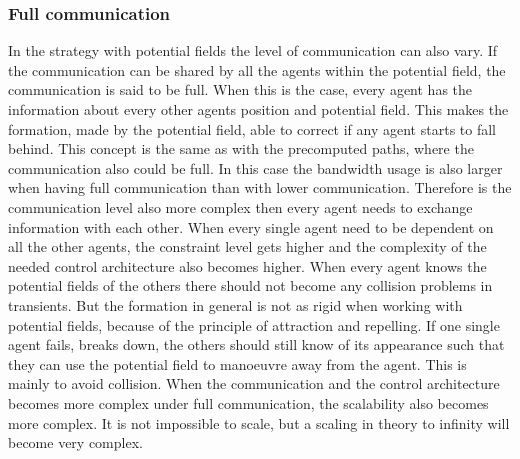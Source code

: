 \subsubsection{Full communication}
In the strategy with potential fields the level of communication can also vary. If the communication can be shared by all the agents within the potential field, the communication is said to be full. When this is the case, every agent has the information about every other agents position and potential field. This makes the formation, made by the potential field, able to correct if any agent starts to fall behind. This concept is the same as with the precomputed paths, where the communication also could be full. In this case the bandwidth usage is also larger when having full communication than with lower communication. Therefore is the communication level also more complex then every agent needs to exchange information with each other. When every single agent need to be dependent on all the other agents, the constraint level gets higher and the complexity of the needed control architecture also becomes higher. When every agent knows the potential fields of the others there should not become any collision problems in transients. But the formation in general is not as rigid when working with potential fields, because of the principle of attraction and repelling. If one single agent fails, breaks down, the others should still know of its appearance such that they can use the potential field to manoeuvre away from the agent. This is mainly to avoid collision. When the communication and the control architecture becomes more complex under full communication, the scalability also becomes more complex. It is not impossible to scale, but a scaling in theory to infinity will become very complex.

